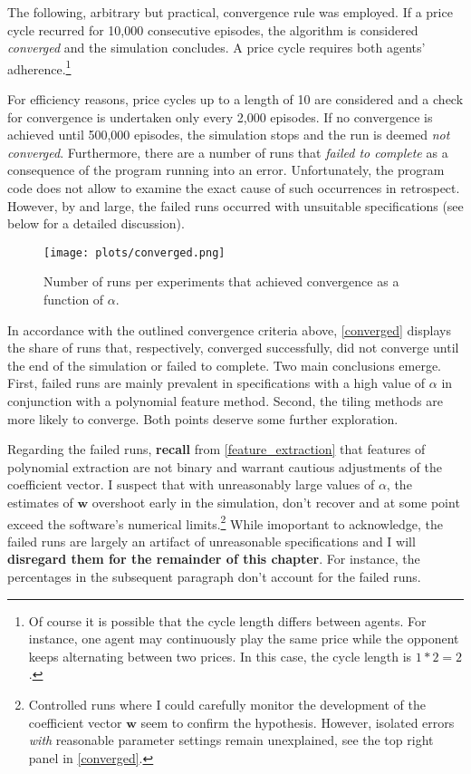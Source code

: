 The following, arbitrary but practical, convergence rule was employed. If a price cycle recurred for 10,000 consecutive episodes, the algorithm is considered \emph{converged} and the simulation concludes. A price cycle requires both agents' adherence.\footnote{Of course it is possible that the cycle length differs between agents. For instance, one agent may continuously play the same price while the opponent keeps alternating between two prices. In this case, the cycle length is $1*2=2$.}

For efficiency reasons, price cycles up to a length of 10 are considered and a check for convergence is undertaken only every 2,000 episodes. If no convergence is achieved until 500,000 episodes, the simulation stops and the run is deemed \emph{not converged}. Furthermore, there are a number of runs that \emph{failed to complete} as a consequence of the program running into an error. Unfortunately, the program code does not allow to examine the exact cause of such occurrences in retrospect. However, by and large, the failed runs occurred with unsuitable specifications (see below for a detailed discussion).

\begin{figure}
	\texttt{[image: plots/converged.png]}
	\caption{Number of runs per experiments that achieved convergence as a function of $\alpha$.}
	\label{converged}
\end{figure}

In accordance with the outlined convergence criteria above, \autoref{converged} displays the share of runs that, respectively, converged successfully, did not converge until the end of the simulation or failed to complete. Two main conclusions emerge. First, failed runs are mainly prevalent in specifications with a high value of $\alpha$ in conjunction with a polynomial feature method. Second, the tiling methods are more likely to converge. Both points deserve some further exploration.

Regarding the failed runs, \textbf{recall} from \autoref{feature_extraction} that features of polynomial extraction are not binary and warrant cautious adjustments of the coefficient vector. I suspect that with unreasonably large values of $\alpha$, the estimates of $\boldsymbol{w}$ overshoot early in the simulation, don't recover and at some point exceed the software's numerical limits.\footnote{Controlled runs where I could carefully monitor the development of the coefficient vector $\boldsymbol{w}$ seem to confirm the hypothesis. However, isolated errors \emph{with} reasonable parameter settings remain unexplained, see the top right panel in \autoref{converged}.} While imoportant to acknowledge, the failed runs are largely an artifact of unreasonable specifications and I will \textbf{disregard them for the remainder of this chapter}. For instance, the percentages in the subsequent paragraph don't account for the failed runs.

